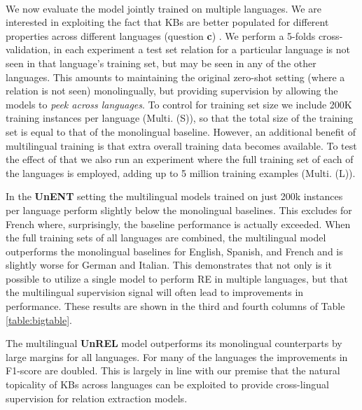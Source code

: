 \paragraph{}
We now evaluate the model jointly trained on multiple languages. We are interested in exploiting the fact that KBs are better populated for different properties across different languages (question \textbf{c})
. We perform a 5-folds cross-validation, in each experiment a test set relation for a particular language is not seen in that language's training set, but may be seen in any of the other languages. This amounts to maintaining the original zero-shot setting (where a relation is not seen) monolingually, but providing supervision by allowing the models to \textit{peek across languages}.  To control for training set size we include 200K training instances per language (Multi. (S)), so that the total size of the training set is equal to that of the monolingual baseline. However, an additional benefit of multilingual training is that extra overall training data becomes available. To test the effect of that we also run an experiment where the full training set of each of the languages is employed, adding up to 5 million training examples (Multi. (L)).

In the \textbf{UnENT} setting the multilingual models trained on just 200k instances per language perform slightly below the monolingual baselines. This excludes for French where, surprisingly, the baseline performance is actually exceeded. When the full training sets of all languages are combined, the multilingual model outperforms the monolingual baselines for English, Spanish, and French and is slightly worse for German and Italian. This demonstrates that not only is it possible to utilize a single model to perform RE in multiple languages, but that the multilingual supervision signal will often lead to improvements in performance. These results are shown in the third and fourth columns of Table \ref{table:bigtable}. 

The multilingual \textbf{UnREL} model outperforms its monolingual counterparts by large margins for all languages. For many of the languages the improvements in F1-score are doubled.
This is largely in line with our premise that the natural topicality of KBs across languages can be exploited to provide cross-lingual supervision for relation extraction models. 


